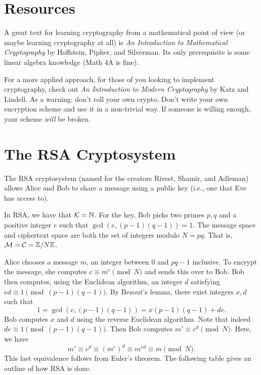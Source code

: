\documentclass{article}
\begin{document}
\section{Resources}

    A great text for learning cryptography from a mathematical point of view (or maybe learning cryptography at all) is \textit{An Introduction to Mathematical Cryptography} by Hoffstein, Pipher, and Silverman.
    Its only prerequisite is some linear algebra knowledge (Math 4A is fine).
    
    For a more applied approach, for those of you looking to implement cryptography, check out \textit{An Introduction to Modern Cryptography} by Katz and Lindell.
    As a warning: don't roll your own crypto.
    Don't write your own encryption scheme and use it in a non-trivial way.
    If someone is willing enough, your scheme \textit{will} be broken.

\section{The RSA Cryptosystem}

    The RSA cryptosystem (named for the creators Rivest, Shamir, and Adleman) allows Alice and Bob to share a message using a public key (i.e., one that Eve has access to).

    In RSA, we have that \(\mathcal{K}=\mathbb{N}\).
    For the key, Bob picks two primes \(p,q\) and a positive integer \(e\) such that \(\gcd(e,(p-1)(q-1))=1\).
    The message space and ciphertext space are both the set of integers modulo \(N=pq\).
    That is, \(\mathcal{M}=\mathcal{C}=\mathbb{Z}/N\mathbb{Z}\).

    Alice chooses a message \(m\), an integer between 0 and \(pq-1\) inclusive.
    To encrypt the message, she computes \(c\equiv m^e\pmod{N}\) and sends this over to Bob.
    Bob then computes, using the Euclidean algorithm, an integer \(d\) satisfying \(ed\equiv 1\pmod{(p-1)(q-1)}\).
    By Bezout's lemma, there exist integers \(x,d\) such that 
    \[1 = \gcd(e,(p-1)(q-1)) = x(p-1)(q-1) + de.\]
    Bob computes \(x\) and \(d\) using the reverse Euclidean algorithm.
    Note that indeed \(de\equiv 1\pmod{(p-1)(q-1)}\).
    Then Bob computes \(m'\equiv c^d\pmod{N}\).
    Here, we have
    \[m' \equiv c^d \equiv \left(m^e\right)^d \equiv m^{ed} \equiv m\pmod{N}.\]
    This last equivalence follows from Euler's theorem. The following table gives an outline of how RSA is done.
\end{document}
